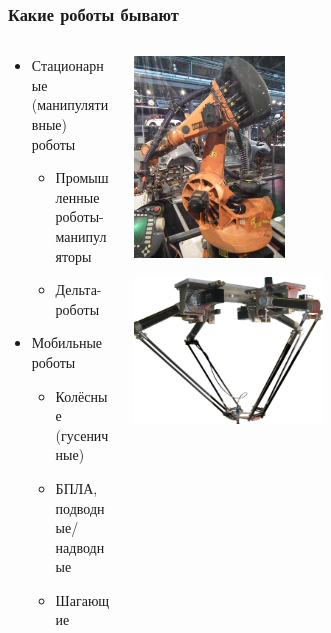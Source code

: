 \documentclass{../../slides-style}
\begin{document}
    \begin{frame}
        \frametitle{Какие роботы бывают}
        \begin{columns}
            \begin{column}{0.5\textwidth}
                \begin{itemize}
                    \item Стационарные (манипулятивные) роботы
                    \begin{itemize}
                        \item Промышленные роботы-манипуляторы
                        \item Дельта-роботы
                    \end{itemize}
                    \item Мобильные роботы
                    \begin{itemize}
                        \item Колёсные (гусеничные)
                        \item БПЛА, подводные/надводные
                        \item Шагающие
                    \end{itemize}
                \end{itemize}
            \end{column}
            \begin{column}{0.5\textwidth}
                \begin{center}
                    \includegraphics[width=0.4\textwidth]{kuka.png}

                    \vspace{1cm}

                    \includegraphics[width=0.5\textwidth]{delta.png}
                \end{center}
            \end{column}
        \end{columns}
    \end{frame}
\end{document}
